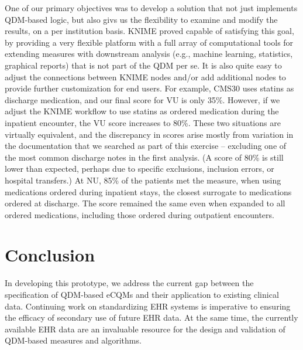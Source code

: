 \documentclass{article}
\begin{document}
One of our primary objectives was to develop a solution that not just implements QDM-based logic, but also givs us the flexibility to examine and modify the results, on a per institution basis. KNIME proved capable of satisfying this goal, by providing a very flexible platform with a full array of computational tools for extending measures with downstream analysis (e.g., machine learning, statistics, graphical reports) that is not part of the QDM per se. It is also quite easy to adjust the connections between KNIME nodes and/or add additional nodes to provide further customization for end users. For example, CMS30 uses statins as discharge medication, and our final score for VU is only 35\%. However, if we adjust the KNIME workflow to use statins as ordered medication during the inpatient encounter, the VU score increases to 80\%. These two situations are virtually equivalent, and the discrepancy in scores arise mostly from variation in the documentation that we searched as part of this exercise -- excluding one of the most common discharge notes in the first analysis. (A score of 80\% is still lower than expected, perhaps due to specific exclusions, inclusion errors, or hospital transfers.) At NU, 85\% of the patients met the measure, when using medications ordered during inpatient stays, the closest surrogate to medications ordered at discharge. The score remained the same even when expanded to all ordered medications, including those ordered during outpatient encounters.

\section{Conclusion}

In developing this prototype, we address the current gap between the specification of QDM-based eCQMs and their application to existing clinical data. Continuing work on standardizing EHR systems is imperative to ensuring the efficacy of secondary use of future EHR data. At the same time, the currently available EHR data are an invaluable resource for the design and validation of QDM-based measures and algorithms.
\end{document}
